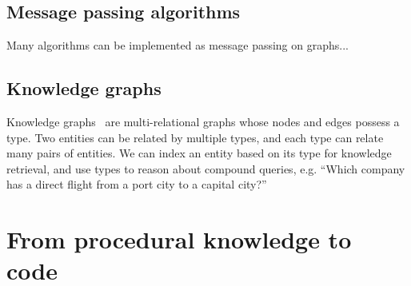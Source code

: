 \documentclass[11pt]{article}
\begin{document}
%


    \subsection{Message passing algorithms}

    Many algorithms can be implemented as message passing on graphs...

    \subsection{Knowledge graphs}

    Knowledge graphs~\citep{hogan2020knowledge} are multi-relational graphs whose nodes and edges possess a type. Two entities can be related by multiple types, and each type can relate many pairs of entities. We can index an entity based on its type for knowledge retrieval, and use types to reason about compound queries, e.g. ``Which company has a direct flight from a port city to a capital city?''

    \pagebreak

    \section{From procedural knowledge to code}\label{sec:applications}
\end{document}
